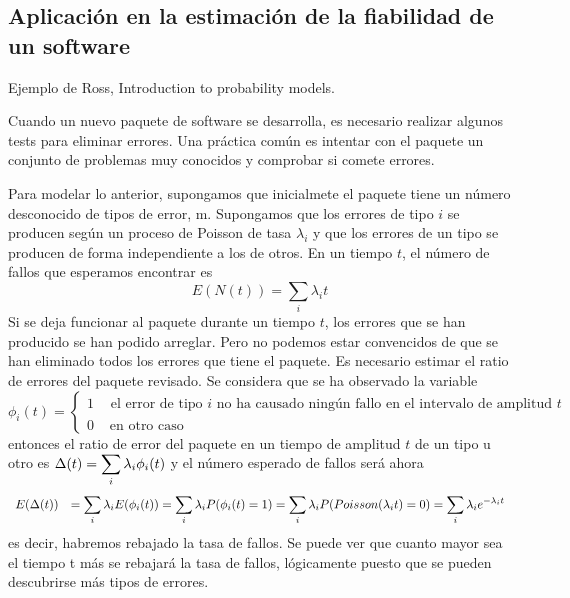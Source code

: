 \subsection{Aplicaci\'{o}n en la estimaci\'{o}n de la fiabilidad de un software}
Ejemplo de Ross, Introduction to probability models.
\par
Cuando un nuevo paquete de software se desarrolla, es necesario
realizar algunos tests para eliminar errores. Una pr\'{a}ctica com\'{u}n
es intentar con el paquete un conjunto de problemas muy conocidos
y comprobar si comete errores.
\par
Para modelar lo anterior, supongamos que inicialmete el paquete
tiene un n\'{u}mero desconocido de tipos de error, m. Supongamos que
los errores de tipo $i$ se producen seg\'{u}n un proceso de Poisson de
tasa $\lambda_i$ y que los errores de un tipo se producen de
forma independiente a los de otros. En un tiempo $t$, el n\'{u}mero
de fallos que esperamos encontrar es
\[
E(N(t))=\displaystyle\sum_i \lambda_i t
\]
Si se deja funcionar al paquete durante un tiempo $t$, los
errores que se han producido se han podido arreglar. Pero no
podemos estar convencidos de que se han eliminado todos los
errores que tiene el paquete. Es necesario estimar el ratio de
errores del paquete revisado. Se considera que se ha observado la
variable
\[
\phi_i(t)=\left \{
\begin{array}{ll}
1&\begin{array}{l} \text{el error de tipo $i$ no ha causado
ning\'{u}n fallo en el intervalo de amplitud $t$}
\end{array}\\
0&\text{ en otro caso}
\end{array}\right.
\]
entonces el ratio de error del paquete en un tiempo de amplitud
$t$ de un tipo u otro es
$\Delta(t)=\displaystyle\displaystyle\sum_i \lambda_i\phi_i(t)$ y
el n\'{u}mero esperado de fallos ser\'{a} ahora
\[
\begin{array}{ll}
E(\Delta(t))&=\displaystyle\displaystyle\sum_i
\lambda_iE(\phi_i(t))=
\displaystyle\displaystyle\sum_i \lambda_i P(\phi_i(t)=1)=
\displaystyle\displaystyle\sum_i \lambda_iP(Poisson(\lambda_i
t)=0)=\displaystyle\displaystyle\sum_i \lambda_i e^{-\lambda_i t}
\end{array}
\]
es decir, habremos rebajado la tasa de fallos. Se puede ver que
cuanto mayor sea el tiempo t m\'{a}s se rebajar\'{a} la tasa de fallos,
l\'{o}gicamente puesto que se pueden descubrirse m\'{a}s tipos de errores.
